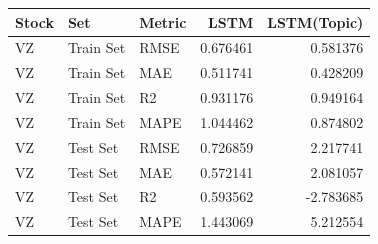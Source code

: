 \begin{tabular}{lllrr}
\toprule
Stock & Set & Metric & LSTM & LSTM(Topic) \\
\midrule
VZ & Train Set & RMSE & 0.676461 & 0.581376 \\
VZ & Train Set & MAE & 0.511741 & 0.428209 \\
VZ & Train Set & R2 & 0.931176 & 0.949164 \\
VZ & Train Set & MAPE & 1.044462 & 0.874802 \\
VZ & Test Set & RMSE & 0.726859 & 2.217741 \\
VZ & Test Set & MAE & 0.572141 & 2.081057 \\
VZ & Test Set & R2 & 0.593562 & -2.783685 \\
VZ & Test Set & MAPE & 1.443069 & 5.212554 \\
\bottomrule
\end{tabular}

